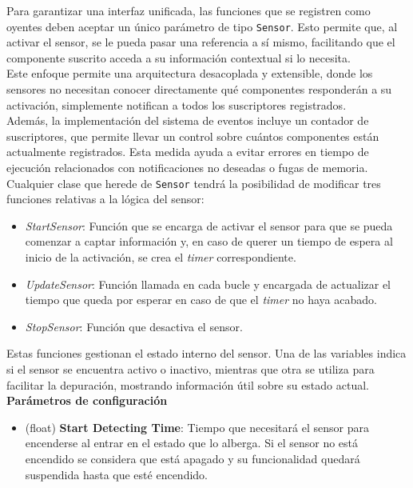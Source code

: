 Para garantizar una interfaz unificada, las funciones que se registren como oyentes deben aceptar un único parámetro de tipo \texttt{Sensor}. Esto permite que, al activar el sensor, se le pueda pasar una referencia a sí mismo, facilitando que el componente suscrito acceda a su información contextual si lo necesita.\\

Este enfoque permite una arquitectura desacoplada y extensible, donde los sensores no necesitan conocer directamente qué componentes responderán a su activación, simplemente notifican a todos los suscriptores registrados.\\

Además, la implementación del sistema de eventos incluye un contador de suscriptores, que permite llevar un control sobre cuántos componentes están actualmente registrados. Esta medida ayuda a evitar errores en tiempo de ejecución relacionados con notificaciones no deseadas o fugas de memoria.\\

Cualquier clase que herede de \texttt{Sensor} tendrá la posibilidad de modificar tres funciones relativas a la lógica del sensor:

\begin{itemize}
	\item \textit{StartSensor}: Función que se encarga de activar el sensor para que se pueda comenzar a captar información y, en caso de querer un tiempo de espera al inicio de la activación, se crea el \textit{timer} correspondiente.
	\item \textit{UpdateSensor}: Función llamada en cada bucle y encargada de actualizar el tiempo que queda por esperar en caso de que el \textit{timer} no haya acabado.
	\item \textit{StopSensor}: Función que desactiva el sensor.
\end{itemize}
Estas funciones gestionan el estado interno del sensor. Una de las variables indica si el sensor se encuentra activo o inactivo, mientras que otra se utiliza para facilitar la depuración, mostrando información útil sobre su estado actual.\\

\textbf{Parámetros de configuración}
\begin{itemize}
	\item (float) \textbf{Start Detecting Time}: Tiempo que necesitará el sensor para encenderse al entrar en el estado que lo alberga. Si el sensor no está encendido se considera que está apagado y su funcionalidad quedará suspendida hasta que esté encendido.
\end{itemize}

